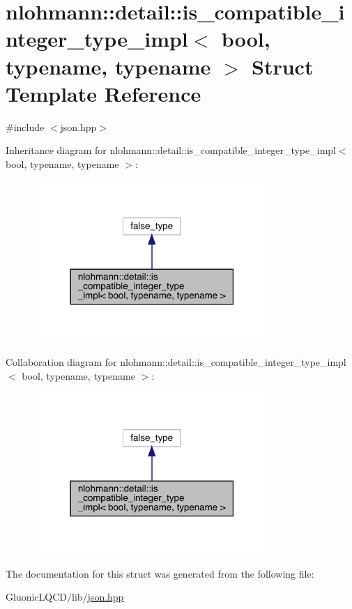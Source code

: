 \hypertarget{structnlohmann_1_1detail_1_1is__compatible__integer__type__impl}{}\section{nlohmann\+::detail\+::is\+\_\+compatible\+\_\+integer\+\_\+type\+\_\+impl$<$ bool, typename, typename $>$ Struct Template Reference}
\label{structnlohmann_1_1detail_1_1is__compatible__integer__type__impl}


{\ttfamily \#include $<$json.\+hpp$>$}



Inheritance diagram for nlohmann\+::detail\+::is\+\_\+compatible\+\_\+integer\+\_\+type\+\_\+impl$<$ bool, typename, typename $>$\+:\nopagebreak
\begin{figure}[H]
\begin{center}
\leavevmode
\includegraphics[width=255pt]{structnlohmann_1_1detail_1_1is__compatible__integer__type__impl__inherit__graph}
\end{center}
\end{figure}


Collaboration diagram for nlohmann\+::detail\+::is\+\_\+compatible\+\_\+integer\+\_\+type\+\_\+impl$<$ bool, typename, typename $>$\+:\nopagebreak
\begin{figure}[H]
\begin{center}
\leavevmode
\includegraphics[width=255pt]{structnlohmann_1_1detail_1_1is__compatible__integer__type__impl__coll__graph}
\end{center}
\end{figure}


The documentation for this struct was generated from the following file\+:\begin{DoxyCompactItemize}
\item 
Gluonic\+L\+Q\+C\+D/lib/\mbox{\hyperlink{json_8hpp}{json.\+hpp}}\end{DoxyCompactItemize}
